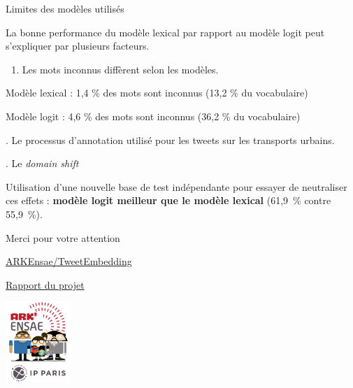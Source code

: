 \documentclass[10pt,xcolor=table,color={dvipsnames,usenames},ignorenonframetext,usepdftitle=false,french]{beamer}
\providecommand{\tightlist}{%
  \setlength{\parskip}{0pt}
  }
\begin{document}
\begin{frame}{Limites des modèles utilisés}

La bonne performance du modèle lexical par rapport au modèle logit peut
s'expliquer par plusieurs facteurs.

\begin{enumerate}
\def\labelenumi{\arabic{enumi}.}
\tightlist
\item
  Les mots inconnus diffèrent selon les modèles.
\end{enumerate}

Modèle lexical : 1,4 \% des mots sont inconnus (13,2 \% du vocabulaire)

Modèle logit : 4,6 \% des mots sont inconnus (36,2 \% du vocabulaire)

. Le processus d'annotation utilisé pour les tweets sur les transports
urbains.

. Le \emph{domain shift}

\pause  Utilisation d'une nouvelle base de test indépendante pour
essayer de neutraliser ces effets : \textbf{modèle logit meilleur que le
modèle lexical} (61,9~\% contre 55,9~\%).

\end{frame}

\begin{frame}{Merci pour votre attention}

\href{https://github.com/ARKEnsae/TweetEmbedding}{\faGithub{} ARKEnsae/TweetEmbedding}

\href{https://arkensae.github.io//TweetEmbedding/Redaction/Rapport_Final/Rapport.pdf}{\faEdit{} Rapport du projet}

\begin{center}
\includegraphics[width = 2.5cm]{img/LOGO-ENSAE.png}
\end{center}

\end{frame}
\end{document}
